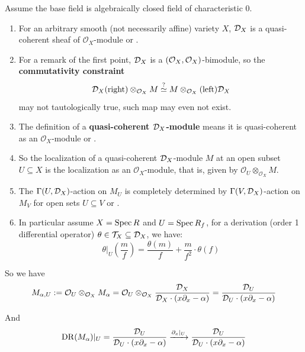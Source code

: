 \begin{lemma}\label{lem:quasi-coherent-sheaf-and-localization-of-D-modules}
    Assume the base field is algebraically closed field of characteristic $0$.
    \begin{enumerate}
        \item For an arbitrary smooth (not necessarily affine) variety $X$, $\mathcal{D}_X$ is a quasi-coherent sheaf of $\mathcal{O}_X$-module \cite[Cor.~4.9. or more exactly Construction~4.4.]{chen2024dmodules} or \cite[Beginning of Sec.~1.4.]{hotta2008d}.
        \item For a remark of the first point, $\mathcal{D}_X$ is a $(\mathcal{O}_X,\mathcal{O}_X)$-bimodule, so the \textbf{commutativity constraint}
              \[
                  \mathcal{D}_X\mathrm{(right)}\otimes_{\mathcal{O}_X} M\stackrel{?}{\simeq} M\otimes_{\mathcal{O}_X}\mathrm{(left)}\mathcal{D}_X
              \]
              may not tautologically true, such map may even not exist.
        \item The definition of a \textbf{quasi-coherent $\mathcal{D}_X$-module} means it is quasi-coherent as an $\mathcal{O}_X$-module \cite[Def.~6.3.]{chen2024dmodules} or \cite[Notation~1.4.1.]{hotta2008d}.
        \item So the localization of a quasi-coherent $\mathcal{D}_X$-module $M$ at an open subset $U \subseteq X$ is the localization as an $\mathcal{O}_X$-module, that is, given by $\mathcal{O}_U \otimes_{\mathcal{O}_X} M$.
        \item The $\Gamma(U,\mathcal{D}_X)$-action on $M_U$ is completely determined by $\Gamma(V,\mathcal{D}_X)$-action on $M_V$ for open sets $U\subseteq V$ \cite[\href{https://stacks.math.columbia.edu/tag/0G36}{Tag 0G36}]{stacks-project} or \cite[Lem.~4.1., Lem.~4.2.]{chen2024dmodules}.
        \item In particular assume $X=\operatorname{Spec} R$ and $U=\operatorname{Spec} R_{f}$, for a derivation (order 1 differential operator) $\theta\in \mathcal{T}_X \subseteq \mathcal{D}_X$, we have: $$\theta|_U\left(\frac{m}{f}\right) = \frac{\theta(m)}{f} + \frac{m}{f^2}\cdot \theta(f)$$
    \end{enumerate}
\end{lemma}


So we have $$M_{\alpha,U} := \mathcal{O}_{U} \otimes_{\mathcal{O}_X} M_{\alpha} = \mathcal{O}_{U} \otimes_{\mathcal{O}_X} \frac{\mathcal{D}_X}{\mathcal{D}_X \cdot (x\partial_x - \alpha)} = \frac{\mathcal{D}_U}{\mathcal{D}_U \cdot (x\partial_x - \alpha)}$$

And
$$\mathrm{DR}(M_{\alpha})|_U =\frac{\mathcal{D}_U}{\mathcal{D}_U \cdot (x\partial_x - \alpha)}\xrightarrow{\partial_x|_U} \frac{\mathcal{D}_U}{\mathcal{D}_U \cdot (x\partial_x - \alpha)}$$

